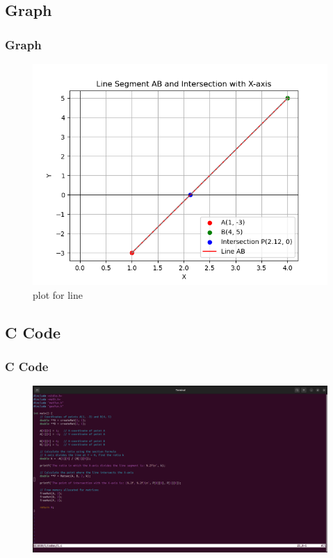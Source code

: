 \documentclass{beamer}
\theoremstyle{remark}
\numberwithin{equation}{section}
\begin{document}
\subsection{Graph}
\begin{frame}
\frametitle{Graph}
\begin{figure}[h]
    \centering
    \includegraphics[width=\columnwidth]{figs/Figure_1.png}
    \caption{plot for line}
 \end{figure}
\end{frame}

\subsection{C Code}
\begin{frame}
\frametitle{C Code}
\begin{figure}[h]
    \centering
    \includegraphics[width=\columnwidth]{figs/1.png}
 \end{figure}    
 \end{frame}
\end{document}
